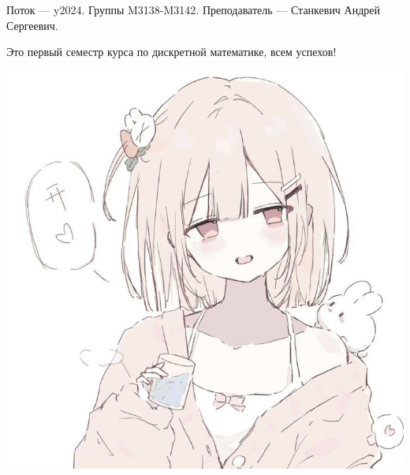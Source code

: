 Поток — y2024.\newline
Группы M3138-M3142.\newline
Преподаватель --- Станкевич Андрей Сергеевич.\par
Это первый семестр курса по дискретной математике, всем успехов!
\begin{center}
   \includegraphics[width=16cm]{assets/vibe.jpg}
\end{center}